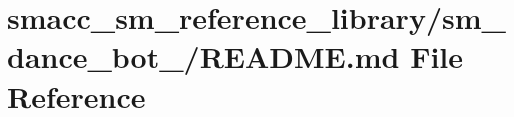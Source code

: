 \hypertarget{smacc__sm__reference__library_2sm__dance__bot__2_2README_8md}{}\section{smacc\+\_\+sm\+\_\+reference\+\_\+library/sm\+\_\+dance\+\_\+bot\+\_/\+R\+E\+A\+D\+ME.md File Reference}
\label{smacc__sm__reference__library_2sm__dance__bot__2_2README_8md}
